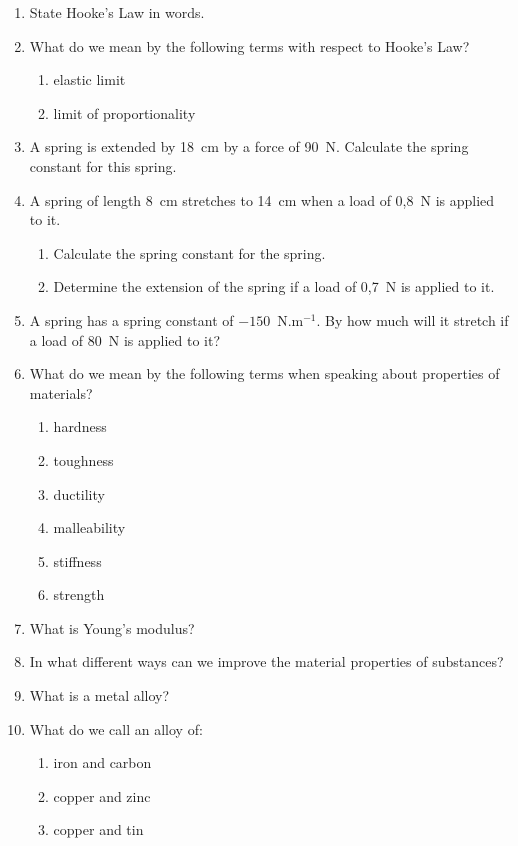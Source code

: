 \begin{eocexercises}{}
\begin{enumerate}

\item State Hooke's Law in words.

\item What do we mean by the following terms with respect to Hooke's Law?
\begin{enumerate}
\item elastic limit
\item limit of proportionality
\end{enumerate}

\item A spring is extended by 18~cm by a force of 90~N. Calculate the spring constant for this spring.

\item A spring of length 8~cm stretches to 14~cm when a load of 0,8~N is applied to it.
\begin{enumerate}
\item Calculate the spring constant for the spring.
\item Determine the extension of the spring if a load of 0,7~N is applied to it.
\end{enumerate}

\item A spring has a spring constant of $-150$~N.m$^{-1}$. By how much will it stretch if a load of 80~N is applied to it?

\item What do we mean by the following terms when speaking about properties of materials?
\begin{enumerate}
\item hardness
\item toughness
\item ductility
\item malleability
\item stiffness
\item strength
\end{enumerate}

\item What is Young's modulus?

\item In what different ways can we improve the material properties of substances?

\item What is a metal alloy?

\item What do we call an alloy of:
\begin{enumerate}
\item iron and carbon
\item copper and zinc 
\item copper and tin
\end{enumerate}


\end{enumerate}
\end{eocexercises}
